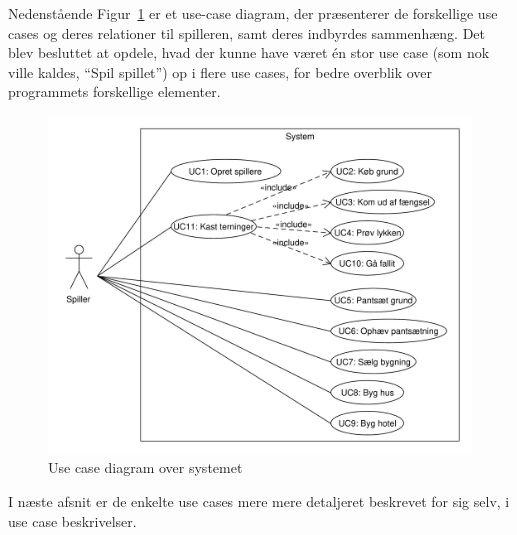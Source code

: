 \documentclass[class=article, crop=false]{standalone}
\begin{document}
    Nedenstående Figur~\ref{fig:use_case_model}  er et use-case diagram, der præsenterer de forskellige use cases og deres relationer til spilleren, samt deres indbyrdes sammenhæng. Det blev besluttet at opdele, hvad der kunne have været én stor use case (som nok ville kaldes, “Spil spillet”) op i flere use cases, for bedre overblik over programmets forskellige elementer.
    \begin{figure}[H]
        \centering

        \includegraphics[scale=0.7]{diagrams/use_case_diagram.pdf}
        \caption{Use case diagram over systemet}\label{fig:use_case_model}
    \end{figure}

    I næste afsnit er de enkelte use cases mere mere detaljeret beskrevet for sig selv, i use case beskrivelser.
\end{document}
